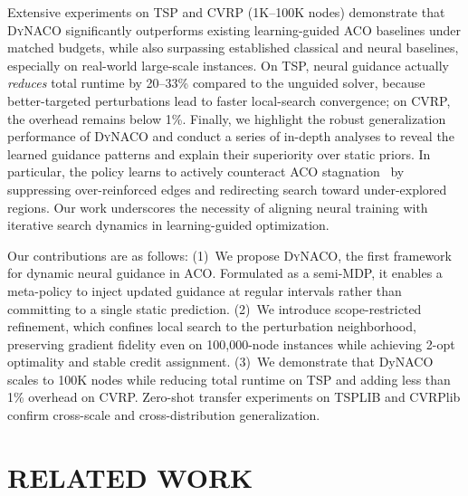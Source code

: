 \documentclass[sigconf,review]{acmart}
\newcommand{\DyNACO}{\textsc{DyNACO}}
\begin{document}
Extensive experiments on TSP and CVRP (1K–100K nodes) demonstrate that \DyNACO{} significantly outperforms existing learning-guided ACO baselines under matched budgets, while also surpassing established classical and neural baselines, especially on real-world large-scale instances. On TSP, neural guidance actually \emph{reduces} total runtime by 20--33\% compared to the unguided solver, because better-targeted perturbations lead to faster local-search convergence; on CVRP, the overhead remains below 1\%. Finally, we highlight the robust generalization performance of \DyNACO{} and conduct a series of in-depth analyses to reveal the learned guidance patterns and explain their superiority over static priors. In particular, the policy learns to actively counteract ACO stagnation~\cite{stagnation} by suppressing over-reinforced edges and redirecting search toward under-explored regions. Our work underscores the necessity of aligning neural training with iterative search dynamics in learning-guided optimization.

Our contributions are as follows:
(1)~We propose \DyNACO{}, the first framework for dynamic neural guidance in ACO. Formulated as a semi-MDP, it enables a meta-policy to inject updated guidance at regular intervals rather than committing to a single static prediction.
(2)~We introduce scope-restricted refinement, which confines local search to the perturbation neighborhood, preserving gradient fidelity even on 100,000-node instances while achieving 2-opt optimality and stable credit assignment.
(3)~We demonstrate that DyNACO scales to 100K nodes while reducing total runtime on TSP and adding less than 1\% overhead on CVRP. Zero-shot transfer experiments on TSPLIB and CVRPlib confirm cross-scale and cross-distribution generalization.


\section{RELATED WORK}
\label{sec:related-nco}
\end{document}
